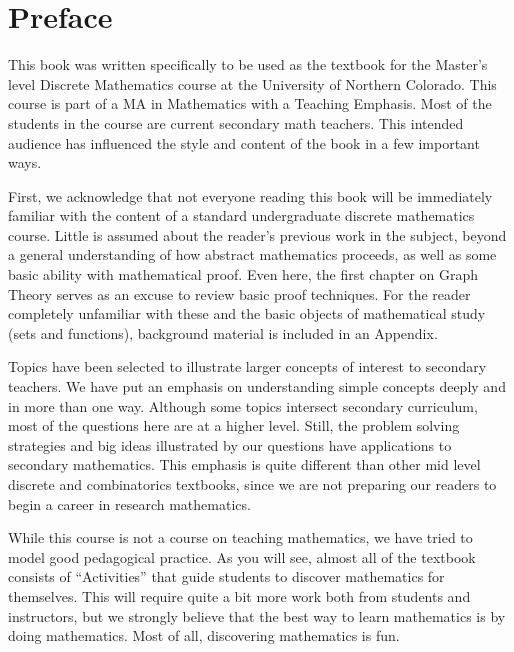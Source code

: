\documentclass[10pt,]{book}
\theoremstyle{plain}
\theoremstyle{definition}
\theoremstyle{definition}
\theoremstyle{definition}
\numberwithin{equation}{chapter}
\begin{document}
\chapter*{Preface}\label{preface}
\hypertarget{p-5}{}%
This book was written specifically to be used as the textbook for the Master's level Discrete Mathematics course at the University of Northern Colorado.  This course is part of a MA in Mathematics with a Teaching Emphasis.  Most of the students in the course are current secondary math teachers.  This intended audience has influenced the style and content of the book in a few important ways.%
\par
\hypertarget{p-6}{}%
First, we acknowledge that not everyone reading this book will be immediately familiar with the content of a standard undergraduate discrete mathematics course.  Little is assumed about the reader's previous work in the subject, beyond a general understanding of how abstract mathematics proceeds, as well as some basic ability with mathematical proof. Even here, the first chapter on Graph Theory serves as an excuse to review basic proof techniques.  For the reader completely unfamiliar with these and the basic objects of mathematical study (sets and functions), background material is included in an Appendix.%
\par
\hypertarget{p-7}{}%
Topics have been selected to illustrate larger concepts of interest to secondary teachers.  We have put an emphasis on understanding simple concepts deeply and in more than one way.  Although some topics intersect secondary curriculum, most of the questions here are at a higher level.  Still, the problem solving strategies and big ideas illustrated by our questions have applications to secondary mathematics.  This emphasis is quite different than other mid level discrete and combinatorics textbooks, since we are not preparing our readers to begin a career in research mathematics.%
\par
\hypertarget{p-8}{}%
While this course is not a course on teaching mathematics, we have tried to model good pedagogical practice.  As you will see, almost all of the textbook consists of ``Activities'' that guide students to discover mathematics for themselves.  This will require quite a bit more work both from students and instructors, but we strongly believe that the best way to learn mathematics is by doing mathematics.  Most of all, discovering mathematics is fun.%
\typeout{************************************************}
\typeout{************************************************}
\end{document}
